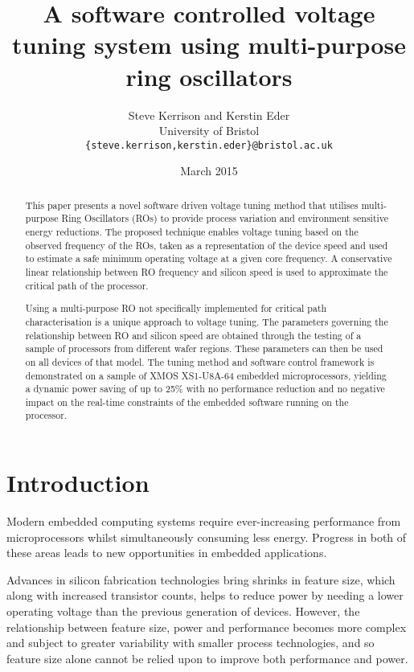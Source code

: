 \documentclass[a4paper,twocolumn,DIV=16]{scrartcl}
\begin{document}
\title{A software controlled voltage tuning system using multi-purpose ring
oscillators}

\date{March 2015}
\author{Steve Kerrison and Kerstin Eder\\
    University of Bristol\\
    \texttt{\{steve.kerrison,kerstin.eder\}@bristol.ac.uk}
}
\maketitle

\begin{abstract}

This paper presents a novel software driven voltage tuning method that utilises
multi-purpose Ring Oscillators (ROs) to provide process variation and
environment sensitive energy reductions. The proposed technique enables voltage
tuning based on the observed frequency of the ROs, taken as a representation of
the device speed and used to estimate a safe minimum operating voltage at a
given core frequency. A conservative linear relationship between RO frequency
and silicon speed is used to approximate the critical path of the processor.

Using a multi-purpose RO not specifically implemented for critical path
characterisation is a unique approach to voltage tuning. The parameters
governing the relationship between RO and silicon speed are obtained through the
testing of a sample of processors from different wafer regions. These parameters
can then be used on all devices of that model. The tuning method and software
control framework is demonstrated on a sample of XMOS XS1-U8A-64 embedded
microprocessors, yielding a dynamic power saving of up to 25\% with no
performance reduction and no negative impact on the real-time constraints of the
embedded software running on the processor.
\end{abstract}

\section{Introduction}

Modern embedded computing systems require ever-increasing performance from
microprocessors whilst simultaneously consuming less energy. Progress in both of
these areas leads to new opportunities in embedded applications.

Advances in silicon fabrication technologies bring shrinks in feature size,
which along with increased transistor counts, helps to reduce power by needing a
lower operating voltage than the previous generation of devices. However, the
relationship between feature size, power and performance becomes more complex
and subject to greater variability with smaller process technologies, and so
feature size alone cannot be relied upon to improve both performance and power.
\end{document}

